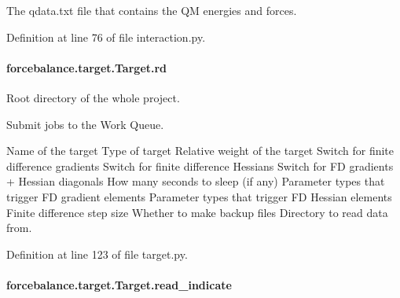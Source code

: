 The qdata.\-txt file that contains the Q\-M energies and forces. 



Definition at line 76 of file interaction.\-py.

\hypertarget{classforcebalance_1_1target_1_1Target_a4edb69fbde792e9f2f27e54b7c978c8e}{
\paragraph[{rd}]{\setlength{\rightskip}{0pt plus 5cm}forcebalance.\-target.\-Target.\-rd\hspace{0.3cm}{\ttfamily [inherited]}}}\label{classforcebalance_1_1target_1_1Target_a4edb69fbde792e9f2f27e54b7c978c8e}


Root directory of the whole project. 

Submit jobs to the Work Queue.

Name of the target Type of target Relative weight of the target Switch for finite difference gradients Switch for finite difference Hessians Switch for F\-D gradients + Hessian diagonals How many seconds to sleep (if any) Parameter types that trigger F\-D gradient elements Parameter types that trigger F\-D Hessian elements Finite difference step size Whether to make backup files Directory to read data from.

Definition at line 123 of file target.\-py.

\hypertarget{classforcebalance_1_1target_1_1Target_aa8af57d5be669c4bb1c0cfd4b7a9220e}{
\paragraph[{read\-\_\-indicate}]{\setlength{\rightskip}{0pt plus 5cm}forcebalance.\-target.\-Target.\-read\-\_\-indicate\hspace{0.3cm}{\ttfamily [inherited]}}}\label{classforcebalance_1_1target_1_1Target_aa8af57d5be669c4bb1c0cfd4b7a9220e}


